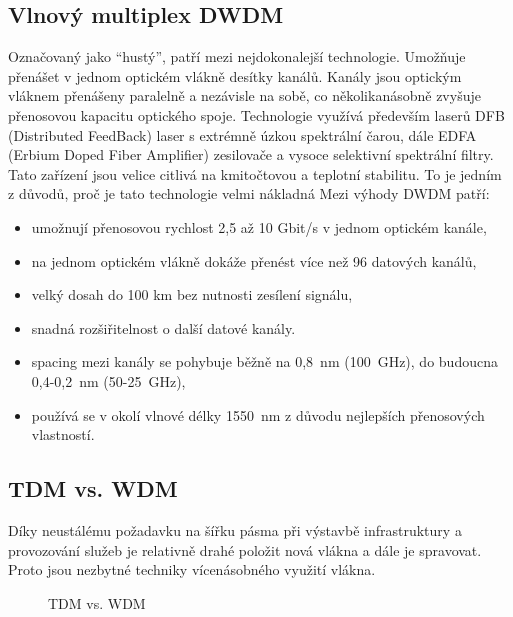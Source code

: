 \subsection{Vlnový multiplex DWDM}
Označovaný jako \enquote{hustý}, patří mezi nejdokonalejší technologie. Umožňuje přenášet v jednom optickém vlákně desítky kanálů. Kanály jsou optickým vláknem přenášeny paralelně a nezávisle na sobě, co několikanásobně zvyšuje přenosovou kapacitu optického spoje. Technologie využívá především laserů DFB (Distributed FeedBack) laser s extrémně úzkou spektrální čarou, dále EDFA (Erbium Doped Fiber Amplifier) zesilovače a vysoce selektivní
spektrální filtry. Tato zařízení jsou velice citlivá na kmitočtovou a teplotní stabilitu. To je jedním z důvodů, proč je tato technologie velmi nákladná
Mezi výhody DWDM patří:
\begin{itemize}
    \item umožnují přenosovou rychlost 2,5 až 10 Gbit/s v jednom optickém kanále,
    \item na jednom optickém vlákně dokáže přenést více než 96 datových kanálů,
    \item velký dosah do 100 km bez nutnosti zesílení signálu,
    \item snadná rozšiřitelnost o další datové kanály.
    \item spacing mezi kanály se pohybuje běžně na 0,8~nm (100~GHz), do budoucna 0,4-0,2~nm (50-25~GHz),
    \item používá se v okolí vlnové délky 1550~nm z důvodu nejlepších přenosových vlastností.
\end{itemize}

\subsection{TDM vs. WDM}
Díky neustálému požadavku na šířku pásma při výstavbě infrastruktury a provozování služeb je relativně drahé položit nová vlákna a dále je
spravovat. Proto jsou nezbytné techniky vícenásobného využití vlákna.

\begin{figure}[htbp]
    \centering
    \hfill
    \caption{TDM vs. WDM}
\end{figure}

